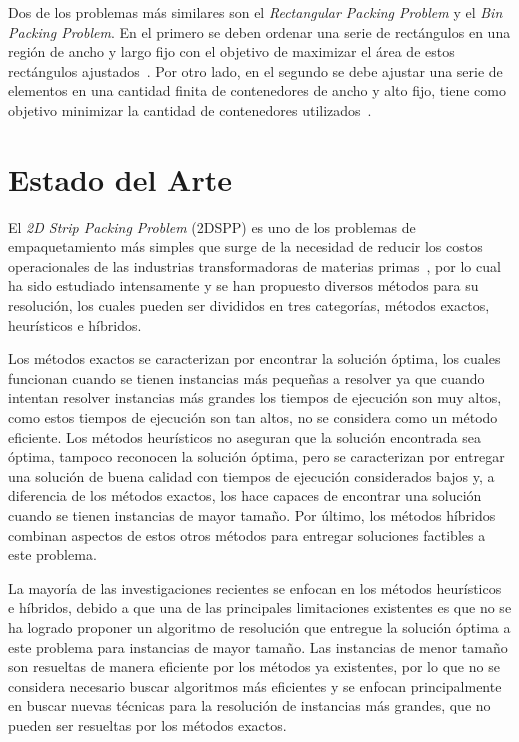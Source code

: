 \documentclass[letter, 10pt]{article}
\begin{document}
Dos de los problemas m\'as similares son el \emph{Rectangular Packing Problem} y el \emph{Bin Packing Problem}. En el primero se deben ordenar una serie de rect\'angulos en una regi\'on de ancho y largo fijo con el objetivo de maximizar el \'area de estos rect\'angulos ajustados~\cite{chen2007two}. Por otro lado, en el segundo se debe ajustar una serie de elementos en una cantidad finita de contenedores de ancho y alto fijo, tiene como objetivo minimizar la cantidad de contenedores utilizados~\cite{lodi2002two}.

\section{Estado del Arte}

El \emph{2D Strip Packing Problem} (2DSPP) es uno de los problemas de empaquetamiento m\'as simples que surge de la necesidad de reducir los costos operacionales de las industrias transformadoras de materias primas~\cite{junior2022rectangular}, por lo cual ha sido estudiado intensamente y se han propuesto diversos m\'etodos para su resoluci\'on, los cuales pueden ser divididos en tres categor\'ias, m\'etodos exactos, heur\'isticos e h\'ibridos.

Los m\'etodos exactos se caracterizan por encontrar la soluci\'on \'optima, los cuales funcionan cuando se tienen instancias m\'as peque\~nas a resolver ya que cuando intentan resolver instancias m\'as grandes los tiempos de ejecuci\'on son muy altos, como estos tiempos de ejecuci\'on son tan altos, no se considera como un m\'etodo eficiente. Los m\'etodos heur\'isticos no aseguran que la soluci\'on encontrada sea \'optima, tampoco reconocen la soluci\'on \'optima, pero se caracterizan por entregar una soluci\'on de buena calidad con tiempos de ejecuci\'on considerados bajos y, a diferencia de los m\'etodos exactos, los hace capaces de encontrar una soluci\'on cuando se tienen instancias de mayor tama\~no. Por \'ultimo, los m\'etodos h\'ibridos combinan aspectos de estos otros m\'etodos para entregar soluciones factibles a este problema.

La mayor\'ia de las investigaciones recientes se enfocan en los m\'etodos heur\'isticos e h\'ibridos, debido a que una de las principales limitaciones existentes es que no se ha logrado proponer un algoritmo de resoluci\'on que entregue la soluci\'on \'optima a este problema para instancias de mayor tama\~no. Las instancias de menor tama\~no son resueltas de manera eficiente por los m\'etodos ya existentes, por lo que no se considera necesario buscar algoritmos m\'as eficientes y se enfocan principalmente en buscar nuevas t\'ecnicas para la resoluci\'on de instancias m\'as grandes, que no pueden ser resueltas por los m\'etodos exactos.
\end{document}
